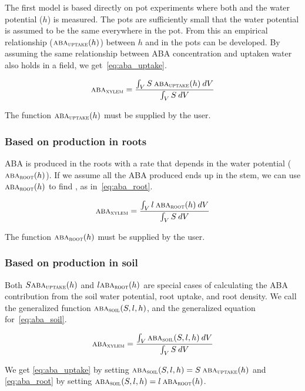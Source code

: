 \documentclass[a4paper,11pt,twoside]{article}
\newcommand{\aba}[1]{\text{\textsc{aba}$_\text{\textsc{#1}}$}}
\begin{document}
The first model is based directly on pot experiments where both
\aba{xylem} and the water potential ($h$) is measured.  The pots are
sufficiently small that the water potential is assumed to be the same
everywhere in the pot.  From this an empirical relationship
($\aba{uptake}(h)$) between $h$ and \aba{xylem} in the pots can be
developed.  By assuming the same relationship between ABA
concentration and uptaken water also holds in a field, we
get~\eqref{eq:aba_uptake}.

\begin{equation}
  \aba{xylem} = \frac{\int_V S \: \aba{uptake}(h) \: dV}{\int_V S \: dV}
  \label{eq:aba_uptake}
\end{equation}

The function $\aba{uptake}(h)$ must be supplied by the user.

\subsubsection{Based on production in roots}

ABA is produced in the roots with a rate that depends in the water
potential ($\aba{root}(h)$).  If we assume all the ABA produced ends up in
the stem, we can use $\aba{root}(h)$ to find \aba{xylem}, as
in~\eqref{eq:aba_root}.

\begin{equation}
  \aba{xylem} = \frac{\int_V l \: \aba{root}(h) \: dV}{\int_V S \: dV}
  \label{eq:aba_root}
\end{equation}

The function $\aba{root}(h)$ must be supplied by the user.

\subsubsection{Based on production in soil}

Both $S \aba{uptake}(h)$ and $l \aba{root}(h)$ are special cases of
calculating the ABA contribution from the soil water potential, root
uptake, and root density.  We call the generalized function
$\aba{soil}(S,l,h)$, and the generalized equation
for~\eqref{eq:aba_soil}.

\begin{equation}
  \aba{xylem} = \frac{\int_V \aba{soil}(S,l,h) \: dV}{\int_V S \: dV}
  \label{eq:aba_soil}
\end{equation}

We get \eqref{eq:aba_uptake} by setting $\aba{soil}(S,l,h) = S \:
\aba{uptake}(h)$ and \eqref{eq:aba_root} by setting $\aba{soil}(S,l,h) = l \:
\aba{root}(h)$.
\end{document}
